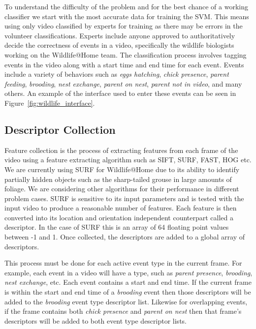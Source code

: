 To understand the difficulty of the problem and for the best chance of a working classifier we start with the most accurate data for training the SVM\@. This means using only video classified by experts for training as there may be errors in the volunteer classifications. Experts include anyone approved to authoritatively decide the correctness of events in a video, specifically the wildlife biologists working on the Wildlife@Home team. The classification process involves tagging events in the video along with a start time and end time for each event. Events include a variety of behaviors such as \emph{eggs hatching}, \emph{chick presence}, \emph{parent feeding}, \emph{brooding}, \emph{nest exchange}, \emph{parent on nest}, \emph{parent not in video}, and many others. An example of the interface used to enter these events can be seen in Figure~\ref{fig:wildlife_interface}.


\subsection{Descriptor Collection}
\label{sec:descriptor_collection}

Feature collection is the process of extracting features from each frame of the video using a feature extracting algorithm such as SIFT\cite{lowe_1999_object}, SURF\cite{bay_2006_surf}, FAST\cite{rosten_2005_real}, HOG\cite{dalal_2005_histograms} etc. We are currently using SURF for Wildlife@Home due to its ability to identify partially hidden objects such as the sharp-tailed grouse in large amounts of foliage. We are considering other algorithms for their performance in different problem cases. SURF is sensitive to its input parameters and is tested with the input video to produce a reasonable number of features. Each feature is then converted into its location and orientation independent counterpart called a descriptor. In the case of SURF this is an array of 64 floating point values between -1 and 1. Once collected, the descriptors are added to a global array of descriptors.

This process must be done for each active event type in the current frame. For example, each event in a video will have a type, such as \emph{parent presence}, \emph{brooding}, \emph{nest exchange}, etc. Each event contains a start and end time. If the current frame is within the start and end time of a \emph{brooding} event then those descriptors will be added to the \emph{brooding} event type descriptor list. Likewise for overlapping events, if the frame contains both \emph{chick presence} and \emph{parent on nest} then that frame's descriptors will be added to both event type descriptor lists.

